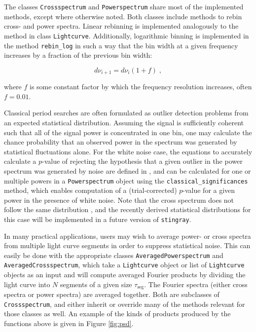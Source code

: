 \documentclass[twocolumn]{aastex62}
\newcommand{\stingray}{\texttt{stingray}\xspace}
\newcommand{\lightcurve}{\texttt{Lightcurve}\xspace}
\newcommand{\crossspectrum}{\texttt{Crossspectrum}\xspace}
\newcommand{\powerspectrum}{\texttt{Powerspectrum}\xspace}
\begin{document}
The classes \crossspectrum and \powerspectrum share most of the implemented methods, except where otherwise noted. 
Both classes include methods to rebin cross- and power spectra. Linear rebinning is implemented analogously to the method in class \lightcurve. 
Additionally, logarithmic binning is implemented in the method \texttt{rebin\_log} in such a way that the bin width at a given frequency increases by a fraction of the previous bin width:

\[
d\nu_{i+1} = d\nu_{i} (1 + f) \; ,
\]

\noindent where $f$ is some constant factor by which the frequency resolution increases, often $f = 0.01$. 

Classical period searches are often formulated as outlier detection problems from an expected statistical distribution. 
Assuming the signal is sufficiently coherent such that all of the signal power is concentrated in one bin, one may calculate the chance probability that an observed power in the spectrum was generated by statistical fluctuations alone. 
For the white noise case, the equations to accurately calculate a $p$-value of rejecting the hypothesis that a given outlier in the power spectrum was generated by noise are defined in \citet{Groth1975}, and can be calculated for one or multiple powers in a \powerspectrum object using the \verb|classical_significances| method, which enables computation of a (trial-corrected) $p$-value for a given power in the presence of white noise.
Note that the cross spectrum does not follow the same distribution \citep{huppenkothen2017}, and the recently derived statistical distributions for this case will be implemented in a future version of \stingray. 

In many practical applications, users may wish to average power- or cross spectra from multiple light curve segments in order to suppress statistical noise. 
This can easily be done with the appropriate classes \texttt{AveragedPowerspectrum} and \texttt{AveragedCrossspectrum}, which take a \lightcurve object or list of \lightcurve objects as an input and will compute averaged Fourier products by dividing the light curve into $N$ segments of a given size $\tau_\mathrm{seg}$. 
The Fourier spectra (either cross spectra or power spectra) are averaged together. 
Both are subclasses of \crossspectrum, and either inherit or override many of the methods relevant for those classes as well. 
An example of the kinds of products produced by the functions above is given in Figure \ref{fig:psd}.
\end{document}
